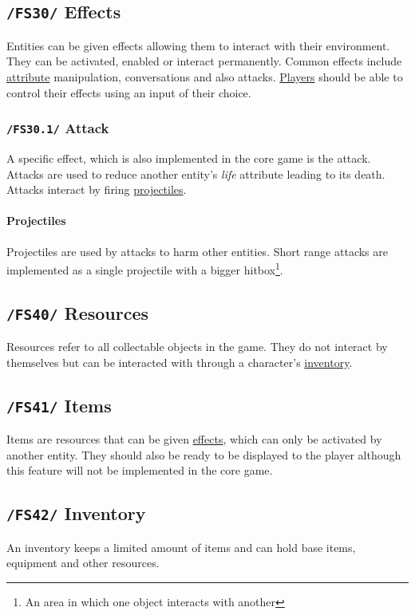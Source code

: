 \documentclass[11pt]{article}
\begin{document}
\subsection{\texttt{/FS30/} Effects}\label{subsec:fs30effects}
Entities can be given effects allowing them to interact with their environment.
They can be activated, enabled or interact permanently. Common effects include \hyperref[subsec:fs50attributes]{attribute} manipulation, conversations and also attacks.
\hyperref[subsec:fs60player]{Players} should be able to control their effects using an input of their choice.
\subsubsection{\texttt{/FS30.1/} Attack}
A specific effect, which is also implemented in the core game is the attack. Attacks are used to reduce another entity's \textit{life} attribute leading to its death.
Attacks interact by firing \hyperref[par:projectiles]{projectiles}.
\paragraph{Projectiles}\label{par:projectiles}
Projectiles are used by attacks to harm other entities. Short range attacks are implemented as a single projectile with a bigger hitbox\footnote{An area in which one object interacts with another}.
\subsection{\texttt{/FS40/} Resources}\label{subsec:fs40resources}
Resources refer to all collectable objects in the game. They do not interact by themselves but can be interacted with through a character's \hyperref[subsec:fs42inventory]{inventory}.
\subsection{\texttt{/FS41/} Items}\label{subsec:fs41items}
Items are resources that can be given \hyperref[subsec:fs30effects]{effects}, which can only be activated by another entity. 
They should also be ready to be displayed to the player although this feature will not be implemented in the core game.
\subsection{\texttt{/FS42/} Inventory}\label{subsec:fs42inventory}
An inventory keeps a limited amount of items and can hold base items, equipment and other resources.
\end{document}
